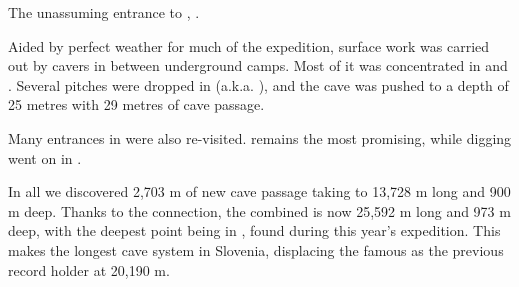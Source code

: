 \begin{marginfigure}
\checkoddpage \ifoddpage \forcerectofloat \else \forceversofloat \fi
\centering
 \caption{The unassuming entrance to , . }
 \label{m2 entrance}
\end{marginfigure}

Aided by perfect weather for much of the expedition, surface work was
carried out by cavers in between underground camps. Most of it was
concentrated in  and . Several pitches were dropped in  (a.k.a.
), and the cave was pushed to a depth of 25 metres with 29 metres of cave passage.

Many entrances in  were also re-visited.  remains the most
promising, while digging went on in .

In all we discovered 2,703 m of new cave passage taking 
to 13,728 m long and 900 m deep. Thanks to the connection, the combined
 is now 25,592 m long and 973 m deep, with the deepest
point being  in , found during this
year's expedition. This makes  the longest cave system in
Slovenia, displacing the famous  as the previous record
holder at 20,190 m.

